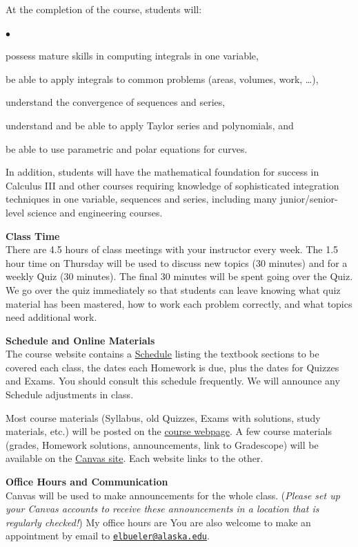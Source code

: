 \documentclass[12pt]{article}
\renewcommand{\emph}[1]{\textsf{\textbf{#1}}}
\newcommand{\localhead}[1]{\par\smallskip\textbf{#1} \smallskip\nobreak\\}%
\def\heading#1{\localhead{\large\emph{#1}}}
\newenvironment{clist}%
{\bgroup\parskip 0pt\begin{list}{$\bullet$}{\partopsep 4pt\topsep 0pt\itemsep -2pt}}%
{\end{list}\egroup}%
\begin{document}
At the completion of the course, students will:
\begin{clist}
\item possess mature skills in computing integrals in one variable,
\item be able to apply integrals to common problems (areas, volumes, work, \dots),
\item understand the convergence of sequences and series,
\item understand and be able to apply Taylor series and polynomials, and
\item be able to use parametric and polar equations for curves.
\end{clist}
In addition, students will have the mathematical foundation for success in Calculus III and other courses requiring knowledge of sophisticated integration techniques in one variable, sequences and series, including many junior/senior-level science and engineering courses.  

\newpage
\heading{Class Time}
There are 4.5 hours of class meetings with your instructor every week. The 1.5 hour time on Thursday will be used to discuss new topics (30 minutes) and for a weekly Quiz (30 minutes).  The final 30 minutes will be spent going over the Quiz.  We go over the quiz immediately so that students can leave knowing what quiz material has been mastered, how to work each problem correctly, and what topics need additional work. 

\heading{Schedule and Online Materials}
The course website contains a \href{https://uaf-math.github.io/calc2/assets/general/S26/bueler/schedule.pdf}{Schedule} listing the textbook sections to be covered each class, the dates each Homework is due, plus the dates for Quizzes and Exams. You should consult this schedule frequently.  We will announce any Schedule adjustments in class.

Most course materials (Syllabus, old Quizzes, Exams with solutions, study materials, etc.) will be posted on the \href{https://uaf-math.github.io/calc2/}{course webpage}.  A few course materials (grades, Homework solutions, announcements, link to Gradescope) will be available on the \href{https://canvas.alaska.edu/courses/31788}{Canvas site}.  Each website links to the other.

\heading{Office Hours and Communication}
Canvas will be used to make announcements for the whole class.  (\textsl{Please set up your Canvas accounts to receive these announcements in a location that is regularly checked!})  My office hours are  You are also welcome to make an appointment by email to \href{mailto:elbueler@alaska.edu}{\texttt{elbueler@alaska.edu}}.\\
\end{document}

